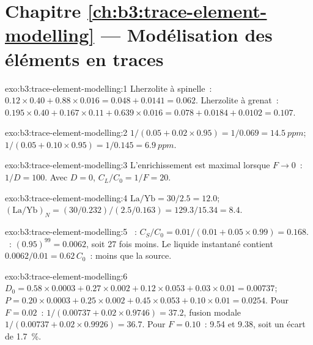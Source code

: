 \section*{Chapitre \ref{ch:b3:trace-element-modelling} --- Modélisation des éléments en traces}

\begin{solution}{exo:b3:trace-element-modelling:1}
Lherzolite à spinelle~: $0.12\times0.40 + 0.88\times0.016 = 0.048 + 0.0141 =
0.062$. Lherzolite à grenat~: $0.195\times0.40 + 0.167\times0.11 +
0.639\times0.016 = 0.078 + 0.0184 + 0.0102 = 0.107$.
\end{solution}

\begin{solution}{exo:b3:trace-element-modelling:2}
$1/(0.05 + 0.02\times0.95) = 1/0.069 = \qty{14.5}{ppm}$;
$1/(0.05 + 0.10\times0.95) = 1/0.145 = \qty{6.9}{ppm}$.
\end{solution}

\begin{solution}{exo:b3:trace-element-modelling:3}
L'enrichissement est maximal lorsque $F \to 0$~: $1/D = 100$. Avec $D = 0$,
$C_L/C_0 = 1/F = 20$.
\end{solution}

\begin{solution}{exo:b3:trace-element-modelling:4}
$\mathrm{La/Yb} = 30/2.5 = 12.0$; $(\mathrm{La}/\mathrm{Yb})_N =
(30/0.232)/(2.5/0.163) = 129.3/15.34 = 8.4$.
\end{solution}

\begin{solution}{exo:b3:trace-element-modelling:5}
~: $C_S/C_0 = 0.01/(0.01 + 0.05\times0.99) = 0.168$. ~:
$(0.95)^{99} = 0.0062$, soit 27 fois moins. Le liquide instantané contient
$0.0062/0.01 = 0.62\,C_0$~: moins que la source.
\end{solution}

\begin{solution}{exo:b3:trace-element-modelling:6}
$D_0 = 0.58\times0.0003 + 0.27\times0.002 + 0.12\times0.053 + 0.03\times0.01
= 0.00737$; $P = 0.20\times0.0003 + 0.25\times0.002 + 0.45\times0.053 +
0.10\times0.01 = 0.0254$. Pour $F = 0.02$~:  $1/(0.00737 +
0.02\times0.9746) = 37.2$, fusion modale $1/(0.00737 + 0.02\times0.9926) = 36.7$. Pour
$F = 0.10$~: 9.54 et 9.38, soit un écart de \qty{1.7}{\percent}.
\end{solution}

